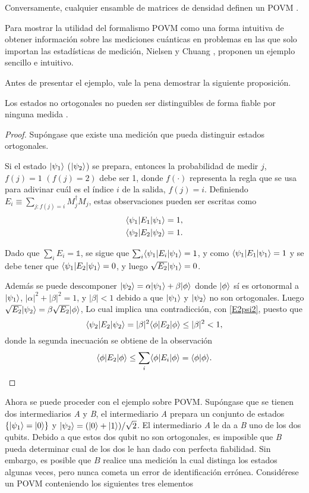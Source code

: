 Conversamente, cualquier ensamble de matrices de densidad definen un POVM {\cite{2007geometry}}.


Para mostrar la utilidad del formalismo POVM como una forma intuitiva de obtener información sobre las mediciones cuánticas en problemas en las que solo importan las estadísticas de medición, Nielsen y Chuang {\cite{nielsen_chuang_2010}}, proponen un ejemplo sencillo e intuitivo.

Antes de presentar el ejemplo, vale la pena demostrar la siguiente proposición.

\begin{proposition}Los estados no ortogonales no pueden ser distinguibles de forma fiable por ninguna medida {\cite{nielsen_chuang_2010}}.
\end{proposition}

\begin{proof}
Supóngase que existe una medición que pueda distinguir estados ortogonales.

Si el estado $|\psi_1\rangle $ ($|\psi_2\rangle $) se prepara, entonces la
probabilidad de medir $j$, $f(j) =1$ $(f(j)=2)$ debe ser 1, donde $f(\cdot)$ representa
la regla que se usa para adivinar cuál es el índice $i$ de la salida, $f(j)=i$. 
Definiendo $E_i\equiv \sum_{j:f(j)=i}M_j^\dagger M_j$, estas observaciones pueden ser escritas como 
\begin{align}
	\langle \psi_1|E_1|\psi_1\rangle=1, \label{E1psi1} \\
	\langle \psi_2|E_2|\psi_2\rangle=1\label{E2psi2}.
\end{align}

Dado que $\sum_i E_i=\mathds{1}$, se sigue que $\sum_i \langle \psi_1|E_i|\psi_1\rangle=1$,
y como $\langle \psi_1|E_1|\psi_1\rangle=1$ y se debe tener que $\langle \psi_1|E_2|\psi_1\rangle=0$,
y luego $\sqrt{E_2}|\psi_1\rangle=0$. 


Además se puede descomponer  
$|\psi_2\rangle=\alpha|\psi_1\rangle +\beta|\phi\rangle$ donde $|\phi\rangle$ sí es ortonormal
a $|\psi_1\rangle $, $|\alpha|^2+|\beta|^2=1$, y $|\beta|<1$ debido a que $|\psi_1\rangle$
y $|\psi_2\rangle$ no son ortogonales. Luego $\sqrt{E_2}|\psi_2\rangle=\beta \sqrt{E_2}|\phi\rangle$, Lo
cual implica una contradicción, con {\ref{E2psi2}}, puesto que \begin{equation}
	\langle \psi_2|E_2|\psi_2\rangle=|\beta|^2 \langle\phi|E_2|\phi\rangle \le |\beta|^2<1,
\end{equation} 
donde la segunda inecuación se obtiene de la observación \[ \langle \phi|E_2|\phi\rangle \le \sum_i\langle \phi|E_i|\phi\rangle= \langle\phi|\phi\rangle. \]
\end{proof}
Ahora se puede proceder con el ejemplo sobre POVM\@. Supóngase que se tienen dos intermediarios \textit{A} y \textit{B}, el intermediario \textit{A} prepara un conjunto de estados $\{|\psi_1\rangle=|0\rangle\}$ y $|\psi_2\rangle=(|0\rangle +|1\rangle)/\sqrt{2}$. El intermediario \textit{A} le da a \textit{B} uno de los dos qubits. Debido a que estos dos qubit no son ortogonales, es imposible que \textit{B} pueda determinar cual de los dos le han dado con perfecta fiabilidad. Sin embargo, es posible que $B$ realice una medición la cual distinga los estados algunas veces, pero nunca cometa un error de identificación errónea. Considérese un POVM conteniendo los siguientes tres elementos 

